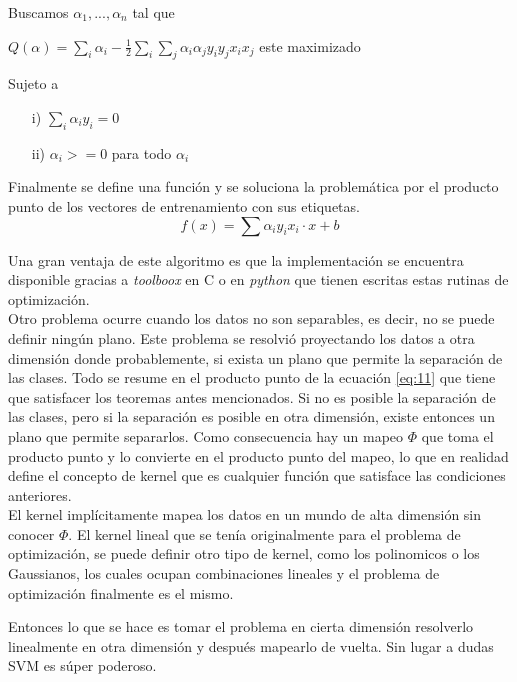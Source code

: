 \documentclass[letterpaper,12pt]{article}
\begin{document}
Buscamos $\alpha_{1},...,\alpha_{n}$ tal que\\

\begin{center}$Q(\alpha)=\sum\limits_{i}\alpha_{i} - \frac{1}{2}\sum\limits_{i}{ \sum\limits_{j}{\alpha_{i}\alpha_{j}y_{i}y_{j}x_{i}x_{j}}}$ este maximizado\\
\end{center}

Sujeto a
\begin{enumerate}
\item[i)] $\sum\limits_{i}{\alpha_{i}y_{i}=0}$
\item[ii)] $\alpha_{i}>=0$ para todo $\alpha_{i}$
\end{enumerate}

Finalmente se define una función y se soluciona la problemática por el producto punto de los vectores de entrenamiento con sus etiquetas.
\begin{equation}
f(x)=\sum \alpha_{i}y_{i}x_{i}\cdot x + b
\label{eq:11}
\end{equation}

Una gran ventaja de este algoritmo es que la implementación se encuentra disponible gracias a \textit{toolboox} en C o en \textit{python} que tienen escritas estas rutinas de optimización.\\
Otro problema ocurre cuando los datos no son separables, es decir, no se puede definir ningún plano. Este problema se resolvió proyectando los datos a otra dimensión donde probablemente, si exista un plano que permite la separación de las clases. Todo se resume en el producto punto de la ecuación \ref{eq:11} que tiene que satisfacer los teoremas antes mencionados. Si no es posible la separación de las clases, pero si la separación es posible en otra dimensión, existe entonces un plano que permite separarlos. Como consecuencia hay un mapeo $\Phi$ que toma el producto punto y lo convierte en el producto punto del mapeo, lo que en realidad define el concepto de kernel que es cualquier función que satisface las condiciones anteriores.\\El kernel implícitamente mapea los datos en un mundo de alta dimensión sin conocer $\Phi$. El kernel lineal que se tenía originalmente para el problema de optimización, se puede definir otro tipo de kernel, como los polinomicos o los Gaussianos, los cuales ocupan combinaciones lineales y el problema de optimización finalmente es el mismo.

Entonces lo que se hace es tomar el problema en cierta dimensión resolverlo linealmente en otra dimensión y después mapearlo de vuelta. Sin lugar a dudas SVM es súper poderoso.
\end{document}
